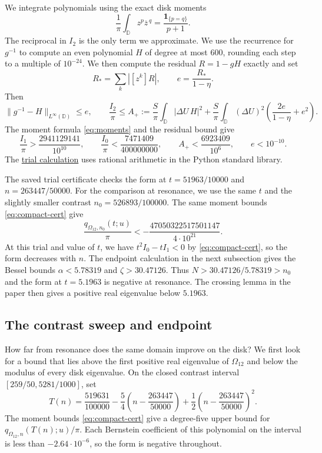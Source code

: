 \documentclass[a4paper,11pt]{amsart}
\newcommand{\repofile}[2]{\href{https://github.com/MColbrook/transmission-shape-optimisation/blob/main/#1}{#2}}
\numberwithin{equation}{section}
\theoremstyle{plain}
\theoremstyle{definition}
\newcommand{\D}{\mathbb D}
\begin{document}
We integrate polynomials using the exact disk moments
\begin{equation}\label{eq:moments}
 \frac1\pi\int_\D z^p\overline z^{\,q}
 =\frac{\mathbf1_{\{p=q\}}}{p+1}.
\end{equation}
The reciprocal in \(I_2\) is the only term we approximate. We use
the recurrence for \(g^{-1}\) to compute an even polynomial \(H\)
of degree at most \(600\), rounding each step to a multiple of
\(10^{-24}\). We then compute the residual \(R=1-gH\) exactly
and set
\[
 R_*=\sum_k|[z^k]R|,\qquad e=\frac{R_*}{1-\eta}.
\]
Then
\[
 \|g^{-1}-H\|_{L^\infty(\D)}\le e,\qquad
 \frac{I_2}{\pi}\le A_+:=
 \frac S\pi\int_\D|\Delta U\,H|^2+
 \frac S\pi\int_\D(\Delta U)^2
       \left(\frac{2e}{1-\eta}+e^2\right).
\]
The moment formula \eqref{eq:moments} and the residual bound give
\begin{equation}\label{eq:compact-cert}
 \frac{I_1}{\pi}>\frac{2941129141}{10^{10}},
 \qquad
 \frac{I_0}{\pi}<\frac{7471409}{400000000},
 \qquad
 A_+<\frac{6923409}{10^6},
 \qquad e<10^{-10}.
\end{equation}
The \repofile{certificates/shape_optimization/certify_near_optimal_domain.py}{trial calculation}
uses rational arithmetic in the Python standard library.

The saved trial certificate checks the form at \(t=51963/10000\)
and \(n=263447/50000\). For the comparison at resonance, we use
the same \(t\) and the slightly smaller contrast
\(n_0=526893/100000\). The same moment bounds
\eqref{eq:compact-cert} give
\[
 \frac{q_{\Omega_{12},n_0}(t;u)}{\pi}
 < -\frac{47050322517501147}{4\cdot10^{21}}.
\]
At this trial and value of \(t\), we have \(t^2I_0-tI_1<0\) by
\eqref{eq:compact-cert}, so the form decreases with \(n\).
The endpoint calculation in the next subsection gives the Bessel
bounds \(\alpha<5.78319\) and \(\zeta>30.47126\). Thus
\(N>30.47126/5.78319>n_0\) and the form at \(t=5.1963\) is negative
at resonance. The crossing lemma in the paper then gives a positive
real eigenvalue below \(5.1963\).

\subsection{The contrast sweep and endpoint}
How far from resonance does the same domain improve on the disk?
We first look for a bound that lies above the first positive real
eigenvalue of \(\Omega_{12}\) and below the modulus of every disk
eigenvalue. On the closed contrast interval
\([259/50,5281/1000]\), set
\[
 T(n)=\frac{519631}{100000}
      -\frac54\left(n-\frac{263447}{50000}\right)
      +\frac12\left(n-\frac{263447}{50000}\right)^2 .
\]
The moment bounds \eqref{eq:compact-cert} give a degree-five upper
bound for \(q_{\Omega_{12},n}(T(n);u)/\pi\). Each Bernstein
coefficient of this polynomial on the interval is less than
\(-2.64\cdot10^{-6}\), so the form is negative throughout.
\end{document}
